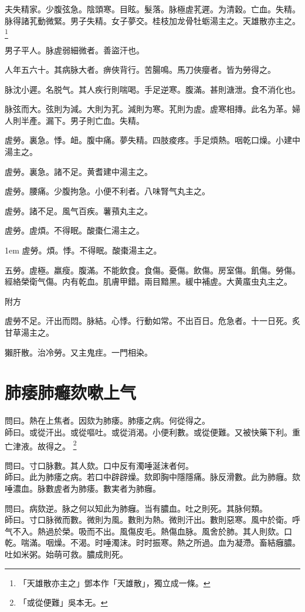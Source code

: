 夫失精家。少腹弦急。陰頭寒。目眩。髮落。脉極虗芤遲。为清穀。亡血。失精。脉得諸芤動微緊。男子失精。女子夢交。桂枝加龙骨牡蛎湯主之。天雄散亦主之。
	\footnote{
		「天雄散亦主之」鄧本作「天雄散」，獨立成一條。
	}

男子平人。脉虗弱細微者。善盜汗也。

人年五六十。其病脉大者。痹俠背行。苦腸鳴。馬刀俠癭者。皆为勞得之。

脉沈小遲。名脱气。其人疾行則喘喝。手足逆寒。腹滿。甚則溏泄。食不消化也。

脉弦而大。弦則为減。大則为芤。減則为寒。芤則为虗。虗寒相摶。此名为革。婦人則半產。漏下。男子則亡血。失精。

虗勞。裏急。悸。衄。腹中痛。夢失精。四肢痠疼。手足煩熱。咽乾口燥。小建中湯主之。

虗勞。裏急。諸不足。黄耆建中湯主之。

虗勞。腰痛。少腹拘急。小便不利者。八味腎气丸主之。

虗勞。諸不足。風气百疾。薯蕷丸主之。

虗勞。虗煩。不得眠。酸棗{\khaaitp 仁}湯主之。

\hangindent 1em
虗勞。煩。悸。不得眠。酸棗湯主之。{\qianjin}

五勞。虗極。羸瘦。腹滿。不能飲食。食傷。憂傷。飲傷。房室傷。飢傷。勞傷。經絡榮衛气傷。内有乾血。肌膚甲錯。兩目黯黑。緩中補虗。大黄䗪虫丸主之。

附方

虗勞不足。汗出而悶。脉結。心悸。行動如常。不出百日。危急者。十一日死。炙甘草湯主之。

獺肝散。治冷勞。又主鬼疰。一門相染。

\chapter{肺痿肺癰欬嗽上气}

問曰。熱在上焦者。因欬为肺痿。肺痿之病。何從得之。\\
師曰。或從汗出。或從嘔吐。或從消渴。小便利數。{\khaaitp 或從便難。}又被快藥下利。重亡津液。故得之。
	\footnote{
		「或從便難」吳本无。
	}

問曰。寸口脉數。其人欬。口中反有濁唾涎沫者何。\\
師曰。{\khaaitp 此}为肺痿之病。若口中辟辟燥。欬即胸中隱隱痛。脉反滑數。此为肺癰。欬唾濃血。脉數虗者为肺痿。數実者为肺癰。

問曰。病欬逆。脉之何以知此为肺癰。当有膿血。吐之則死。其脉何類。\\
師曰。寸口脉微而數。微則为風。數則为熱。微則汗出。數則惡寒。風中於衛。呼气不入。熱過於榮。吸而不出。風傷皮毛。熱傷血脉。風舍於肺。其人則欬。口乾。喘滿。咽燥。不渴。时唾濁沫。时时振寒。熱之所過。血为凝滯。畜結癰膿。吐如米粥。始萌可救。膿成則死。

